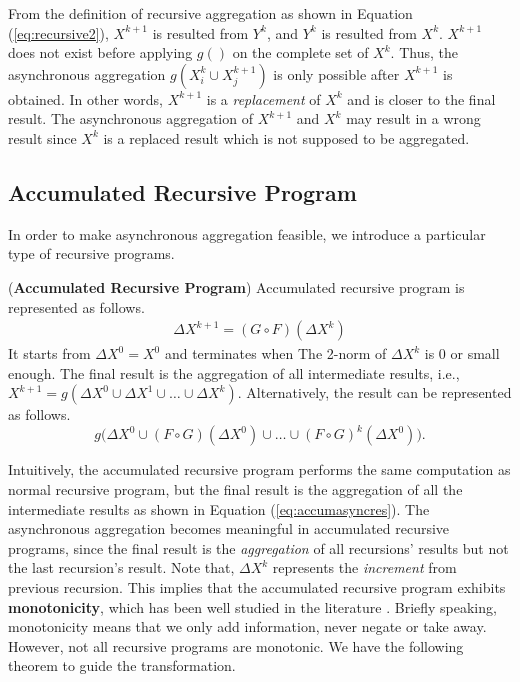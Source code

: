 \documentclass{vldb}
\begin{document}
From the definition of recursive aggregation as shown in Equation (\ref{eq:recursive2}), $X^{k+1}$ is resulted from $Y^k$, and $Y^k$ is resulted from $X^k$. $X^{k+1}$ does not exist before applying $g()$ on the complete set of $X^k$. Thus, the asynchronous aggregation $g(X_i^k\cup X_j^{k+1})$ is only possible after $X^{k+1}$ is obtained. In other words, $X^{k+1}$ is a \emph{replacement} of $X^k$ and is closer to the final result. The asynchronous aggregation of $X^{k+1}$ and $X^k$ may result in a wrong result since $X^k$ is a replaced result which is not supposed to be aggregated.

\subsection{Accumulated Recursive Program}
\label{sec:async:accrec}

In order to make asynchronous aggregation feasible, we introduce a particular type of recursive programs.

\begin{definition}
	\label{def:accumasync}
	(\textbf{Accumulated Recursive Program}) Accumulated recursive program is represented as follows.
	\begin{equation}\label{eq:accumasync}
	\begin{aligned}
	\Delta X^{k+1}=(G\circ F)(\Delta X^k)
	\end{aligned}
	\end{equation}
	It starts from $\Delta X^0=X^0$ and terminates when The 2-norm of $\Delta X^k$ is 0 or small enough. The final result is the aggregation of all intermediate results, i.e., $X^{k+1}=g(\Delta X^{0} \cup \Delta X^{1} \cup \ldots \cup \Delta X^{k})$. Alternatively, the result can be represented as follows.
	\begin{equation}
	\label{eq:accumasyncres}
	g\Big(\Delta X^0\cup (F\circ G)(\Delta X^0)\cup\ldots\cup (F\circ G)^k(\Delta X^0)\Big).
	\end{equation}
\end{definition}

Intuitively, the accumulated recursive program performs the same computation as normal recursive program, but the final result is the aggregation of all the intermediate results as shown in Equation (\ref{eq:accumasyncres}). The asynchronous aggregation becomes meaningful in accumulated recursive programs, since the final result is the \emph{aggregation} of all recursions' results but not the last recursion's result. Note that, $\Delta X^{k}$ represents the \emph{increment} from previous recursion. This implies that the accumulated recursive program exhibits \textbf{monotonicity}, which has been well studied in the literature \cite{Hellerstein:2010:DIE:1860702.1860704,calm,Lam:2013:SDE:2510649.2511289,Wang:2015:AFR:2824032.2824052}. Briefly speaking, monotonicity means that we only add information, never negate or take away. However, not all recursive programs are monotonic. We have the following theorem to guide the transformation.
\end{document}
